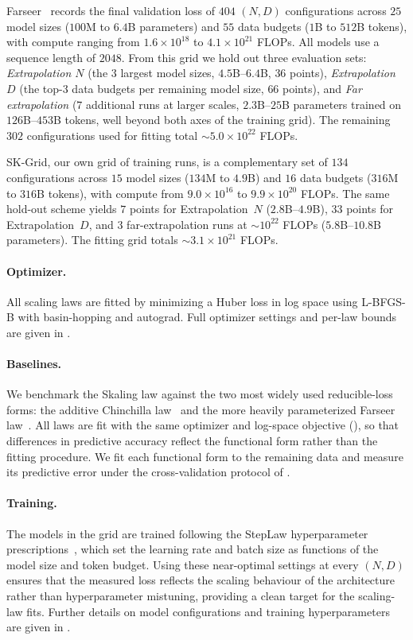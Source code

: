 \documentclass[]{fairmeta}
\newcommand{\ska}{Skaling}
\begin{document}
Farseer~\citep{li2025predictable} records the final validation loss of $404$ $(N,D)$ configurations across $25$ model sizes ($100$M to $6.4$B parameters) and $55$ data budgets ($1$B to $512$B tokens), with compute ranging from $1.6\times10^{18}$ to $4.1\times10^{21}$ FLOPs. All models use a sequence length of $2048$. From this grid we hold out three evaluation sets: \emph{Extrapolation $N$} (the $3$ largest model sizes, $4.5$B--$6.4$B, $36$ points), \emph{Extrapolation $D$} (the top-$3$ data budgets per remaining model size, $66$ points), and \emph{Far extrapolation} ($7$ additional runs at larger scales, $2.3$B--$25$B parameters trained on $126$B--$453$B tokens, well beyond both axes of the training grid). The remaining $302$ configurations used for fitting total $\sim\!5.0\times10^{22}$ FLOPs.

SK-Grid, our own grid of training runs, is a complementary set of $134$ configurations across $15$ model sizes ($134$M to $4.9$B) and $16$ data budgets ($316$M to $316$B tokens), with compute from $9.0\times10^{16}$ to $9.9\times10^{20}$ FLOPs. The same hold-out scheme yields $7$ points for Extrapolation~$N$ ($2.8$B--$4.9$B), $33$ points for Extrapolation~$D$, and $3$ far-extrapolation runs at $\sim\!10^{22}$ FLOPs ($5.8$B--$10.8$B parameters). The fitting grid totals $\sim\!3.1\times10^{21}$ FLOPs.

\paragraph{Optimizer.} All scaling laws are fitted by minimizing a Huber loss in log space using L-BFGS-B with basin-hopping and autograd. Full optimizer settings and per-law bounds are given in .

\paragraph{Baselines.} We benchmark the \ska{} law against the two most widely used reducible-loss forms: the additive Chinchilla law~\citep{hoffmann2022training} and the more heavily parameterized Farseer law~\citep{li2025predictable}. All laws are fit with the same optimizer and log-space objective (), so that differences in predictive accuracy reflect the functional form rather than the fitting procedure. We fit each functional form to the remaining data and measure its predictive error under the cross-validation protocol of .

\paragraph{Training.} The models in the grid are trained following the StepLaw hyperparameter prescriptions~\citep{li2025hyperopt}, which set the learning rate and batch size as functions of the model size and token budget. Using these near-optimal settings at every $(N,D)$ ensures that the measured loss reflects the scaling behaviour of the architecture rather than hyperparameter mistuning, providing a clean target for the scaling-law fits. Further details on model configurations and training hyperparameters are given in .
\end{document}

